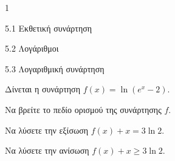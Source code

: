 \begin{ylh}{1}
\item 5.1 Εκθετική συνάρτηση
\item 5.2 Λογάριθμοι
\item 5.3 Λογαριθμική συνάρτηση
\end{ylh}
Δίνεται η συνάρτηση $f(x) = \ln(e^x - 2)$.
\begin{alist}
\item Να βρείτε το πεδίο ορισμού της συνάρτησης $f$.
\item Να λύσετε την εξίσωση $f(x) + x = 3\ln 2$.
\item Να λύσετε την ανίσωση $f(x) + x \ge 3\ln 2$.
\end{alist}

